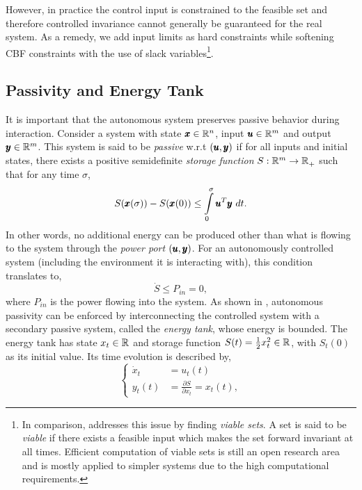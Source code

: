 However, in practice the control input is constrained to the feasible set and therefore controlled invariance cannot generally be guaranteed for the real system. As a remedy, we add input limits as hard constraints while softening CBF constraints with the use of slack variables\footnote{In comparison, \cite{gurriet2018towards} addresses this issue by finding \emph{viable sets}. A set is said to be \emph{viable} if there exists a feasible input which makes the set forward invariant at all times. Efficient computation of viable sets is still an open research area and is mostly applied to simpler systems due to the high computational requirements.}.

\subsection{Passivity and Energy Tank}
It is important that the autonomous system preserves passive behavior during interaction. Consider a system with state $\pmb{x} \in \mathbb{R}^{n}$, input $\pmb{u} \in \mathbb{R}^{m}$ and output $\pmb{y} \in \mathbb{R}^{m}$. 
This system is said to be \emph{passive} w.r.t $(\pmb{u},\pmb{y})$ if for all inputs and initial states, there exists a positive semidefinite \emph{storage function} $S: \mathbb{R}^{m} \rightarrow \mathbb{R}^{}_+$ such that for any time $\sigma$,
\begin{equation}
    S(\pmb{x}(\sigma)) - S(\pmb{x}(0))\leq \int\limits_{0}^{\sigma} \pmb{u}^T \pmb{y}\ dt.  
\end{equation}
In other words, no additional energy can be produced other than what is flowing to the system through the \textit{power port} $(\pmb{u},\pmb{y})$.
For an autonomously controlled system (including the environment it is interacting with), this condition translates to, 
\begin{equation}
    \dot{S} \leq P_{in} = 0,
\end{equation}
where $P_{in}$ is the power flowing into the system. As shown in \cite{shahriari2018valve}, autonomous passivity can be enforced by interconnecting the controlled system with a secondary passive system, called the \emph{energy tank}, whose energy is bounded. The energy tank has state $x_t \in \mathbb{R}^{}$ and storage function $S(t) = \frac{1}{2} x_t^2 \in \mathbb{R}^{}$, with $S_t(0)$ as its initial value. Its time evolution is described by,
\begin{equation}
\begin{cases}
\dot{x}_t &= u_t(t) \\
y_t(t) &= \frac{\partial S}{\partial x_t} = x_t(t),
\end{cases}
\end{equation}
